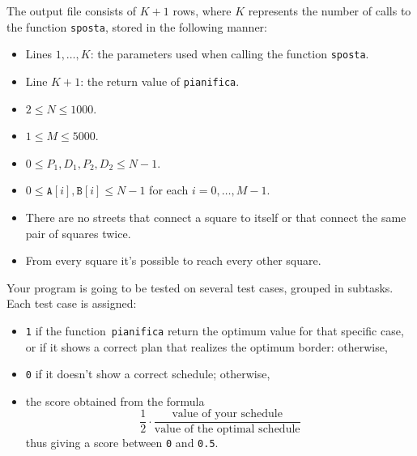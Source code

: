 The output file consists of $K+1$ rows, where $K$ represents the number of calls to the function \texttt{sposta}, stored in the following manner:
\begin{itemize}[nolistsep,itemsep=2mm]
\item Lines $1, \ldots, K$: the parameters used when calling the function \texttt{sposta}.
\item Line $K+1$: the return value of \texttt{pianifica}.
\end{itemize}



\Constraints

\begin{itemize}[nolistsep, itemsep=2mm]
	\item $2 \le N \le 1000$.
	\item $1 \le M \le 5000$.
	\item $0 \le P_1, D_1, P_2, D_2 \le N-1$.
	\item $0 \le \texttt{A}[i], \texttt{B}[i] \le N-1$ for each $i=0, \ldots, M-1$.
	\item There are no streets that connect a square to itself or that connect the same pair of squares twice.
	\item From every square it's possible to reach every other square.
\end{itemize}



\Scoring

Your program is going to be tested on several test cases, grouped in subtasks. Each test case is assigned:
\begin{itemize}
\item \texttt{1} if the function~\texttt{pianifica} return the optimum value for that specific case, or if it shows a correct plan that realizes the optimum border: otherwise,
\item \texttt{0} if it doesn't show a correct schedule; otherwise,
\item the score obtained from the formula
        \[
          \dfrac{\text{1}}{2} \cdot
          \dfrac{\text{value of your schedule}}{\text{value of the optimal schedule}}
        \]
        thus giving a score between \texttt{0} and \texttt{0.5}.
\end{itemize}

